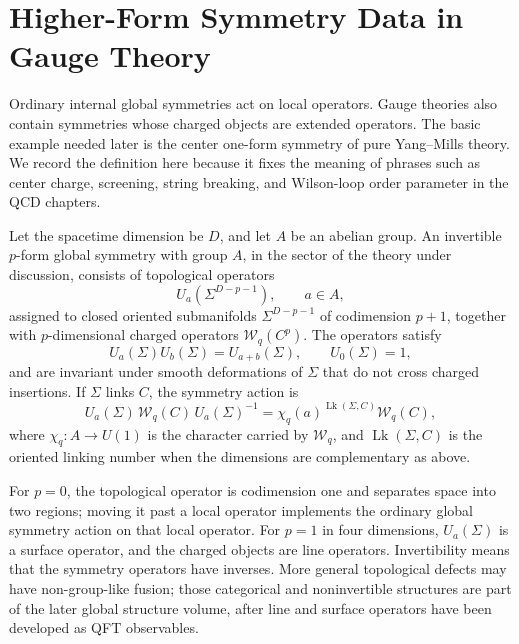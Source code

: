 \section{Higher-Form Symmetry Data in Gauge Theory}
\label{sec:higher-form-symmetry-data-gauge-theory}

Ordinary internal global symmetries act on local operators.  Gauge theories
also contain symmetries whose charged objects are extended operators.  The
basic example needed later is the center one-form symmetry of pure
Yang--Mills theory.  We record the definition here because it fixes the
meaning of phrases such as center charge, screening, string breaking, and
Wilson-loop order parameter in the QCD chapters.

\begin{definition}
\label{def:invertible-p-form-symmetry}
Let the spacetime dimension be \(D\), and let \(A\) be an abelian group.  An
invertible \(p\)-form global symmetry with group \(A\), in the sector of the
theory under discussion, consists of topological operators
\[
  U_a(\Sigma^{D-p-1}),
  \qquad a\in A,
\]
assigned to closed oriented submanifolds \(\Sigma^{D-p-1}\) of codimension
\(p+1\), together with \(p\)-dimensional charged operators
\(\mathcal W_q(C^p)\).  The operators satisfy
\[
  U_a(\Sigma)U_b(\Sigma)=U_{a+b}(\Sigma),
  \qquad
  U_0(\Sigma)=1,
\]
and are invariant under smooth deformations of \(\Sigma\) that do not cross
charged insertions.  If \(\Sigma\) links \(C\), the symmetry action is
\begin{equation}
  U_a(\Sigma)\,\mathcal W_q(C)\,U_a(\Sigma)^{-1}
  =
  \chi_q(a)^{\operatorname{Lk}(\Sigma,C)}
  \mathcal W_q(C),
  \label{eq:p-form-symmetry-linking-action}
\end{equation}
where \(\chi_q:A\to U(1)\) is the character carried by
\(\mathcal W_q\), and \(\operatorname{Lk}(\Sigma,C)\) is the oriented linking
number when the dimensions are complementary as above.
\end{definition}

For \(p=0\), the topological operator is codimension one and separates space
into two regions; moving it past a local operator implements the ordinary
global symmetry action on that local operator.  For \(p=1\) in four
dimensions, \(U_a(\Sigma)\) is a surface operator, and the charged objects are
line operators.  Invertibility means that the symmetry operators have
inverses.  More general topological defects may have non-group-like fusion;
those categorical and noninvertible structures are part of the later global
structure volume, after line and surface operators have been developed as
QFT observables.

